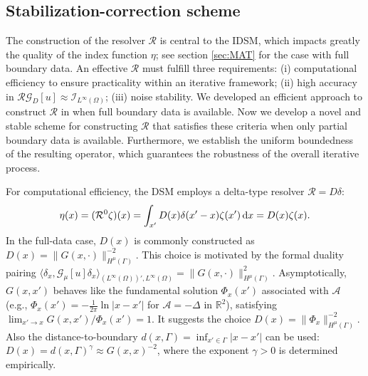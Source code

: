 \documentclass[onefignum,onetabnum]{siamart190516}
\numberwithin{equation}{section}
\begin{document}
\subsection{Stabilization-correction scheme}\label{subsec:sroc}

The construction of the resolver $\mathcal{R}$ is central to the IDSM, which impacts greatly the quality of the index function $\eta${; see section \ref{sec:MAT} for the case with full boundary data}.
An effective $\mathcal{R}$ must fulfill three  requirements: (i) computational efficiency to ensure practicality within an iterative framework; (ii) high accuracy in $\mathcal{R}\mathcal{G}_{D}[u] \approx \mathcal{I}_{L^{\infty}(\Omega)}$; (iii) noise stability.
{
We developed an efficient approach to construct $\mathcal{R}$ in \cite{Ito2025Iterative} when full boundary data is available. 
Now we develop a novel and stable scheme for constructing $\mathcal{R}$ that satisfies these criteria when only partial boundary data is available.}
Furthermore, we  establish the uniform boundedness of the resulting operator, which guarantees the robustness of the overall iterative process.

{For computational efficiency, the DSM \cite{Zou2014,Zou2015,Chow2021} employs a delta-type resolver $\mathcal{R}=D\delta$:
\begin{equation}\label{eqn13}
\eta(x) = (\mathcal{R}^{0}\zeta)(x)=\int_{x'}D(x)\delta(x'-x)\zeta(x')\,{\rm d}x = D(x)\zeta(x).
\end{equation}}
In the full-data case, $D(x)$ is commonly constructed as $D(x) = \|G(x,\cdot)\|_{H^{\mu}(\Gamma)}^{-2}$.
This choice is motivated by the formal duality pairing $\langle \delta_{x},\mathcal{G}_{\mu}[u]\delta_{x}\rangle_{(L^{\infty}(\Omega))',L^{\infty}(\Omega)} = \|G(x,\cdot)\|_{H^{\mu}(\Gamma)}^{2}$.
Asymptotically, $G(x, x')$ behaves like the fundamental solution $\Phi_x(x')$ associated with $\mathcal{A}$ (e.g., $\Phi_x(x') = -\frac{1}{2\pi}\ln|x - x'|$ for $\mathcal{A} = -\Delta$ in $\mathbb{R}^2$), satisfying $\lim_{x' \to x} G(x, x') / \Phi_x(x') = 1$.
It suggests the choice $D(x) = \|\Phi_x\|_{H^{\mu}(\Gamma)}^{-2}$.
Also the distance-to-boundary $d(x, \Gamma) = \inf_{x' \in \Gamma} |x - x'|$ can be used: $D(x) = d(x,\Gamma)^{\gamma}\approx G(x,x)^{-2}$, where the exponent $\gamma > 0$ is determined empirically.
\end{document}
